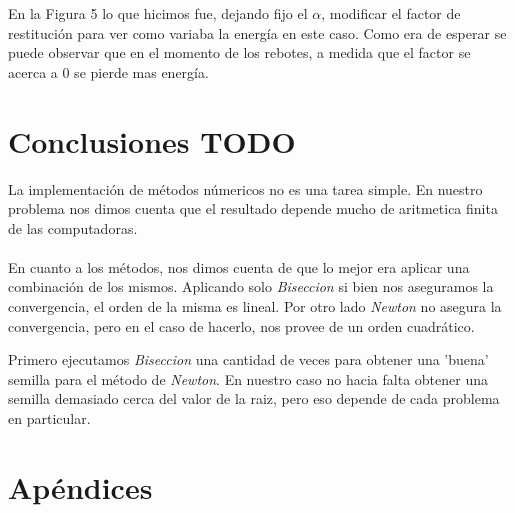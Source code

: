 \documentclass[a4paper]{article}
\begin{document}
	En la Figura 5 lo que hicimos fue, dejando fijo el $\alpha$, modificar el factor de restitución para ver como variaba la energía en este caso. Como era de esperar se puede observar que en el momento de los rebotes, a medida que el factor se acerca a 0 se pierde mas energía.  
	
	
 
 
 

\section{Conclusiones TODO}
La implementación de métodos númericos no es una tarea simple. En nuestro problema nos dimos cuenta que el resultado depende mucho de aritmetica finita de las computadoras. \\\\


En cuanto a los métodos, nos dimos cuenta de que lo mejor era aplicar una combinación de los mismos. Aplicando solo \textit{Biseccion} si bien nos aseguramos la convergencia, el orden de la misma es lineal. Por otro lado \textit{Newton} no asegura la convergencia, pero en el caso de hacerlo, nos provee de un orden cuadrático. 


Primero ejecutamos \textit{Biseccion} una cantidad de veces para obtener una 'buena' semilla para el método de \textit{Newton}. En nuestro caso no hacia falta obtener una semilla demasiado cerca del valor de la raiz, pero eso depende de cada problema en particular. 




\newpage

\section{Apéndices}
\end{document}
